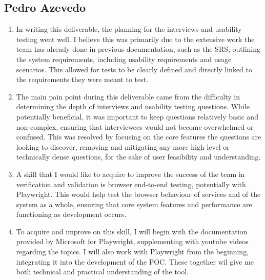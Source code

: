 \documentclass[12pt, titlepage]{article}
\begin{document}
\subsection*{Pedro Azevedo}
\begin{enumerate}
\item In writing this deliverable, the planning for the interviews and usability testing went well. I believe this was primarily due to the extensive work the team has already done in previous documentation, such as the SRS, 
outlining the system requirements, including usability requirements and usage scenarios. This allowed for tests to be clearly defined and directly linked to the requirements they were meant to test.
\item The main pain point during this deliverable came from the difficulty in determining the depth of interviews and usability testing questions. While potentially beneficial, it was important to keep questions relatively basic and 
non-complex, ensuring that interviewees would not become overwhelmed or confused. This was resolved by focusing on the core features the questions are looking to discover, removing and mitigating any more high level or technically dense 
questions, for the sake of user feasibility and understanding.
\item A skill that I would like to acquire to improve the success of the team in verification and validation is browser end-to-end testing, potentially with Playwright. 
This would help test the browser behaviour of services and of the system as a whole, ensuring that core system features and performance are functioning as development occurs.
\item To acquire and improve on this skill, I will begin with the documentation provided by Microsoft for Playwright, supplementing with youtube videos regarding the topics. 
I will also work with Playwright from the beginning, integrating it into the development of the POC. These together wil give me both technical and practical understanding of the tool.
\end{enumerate}
\end{document}
